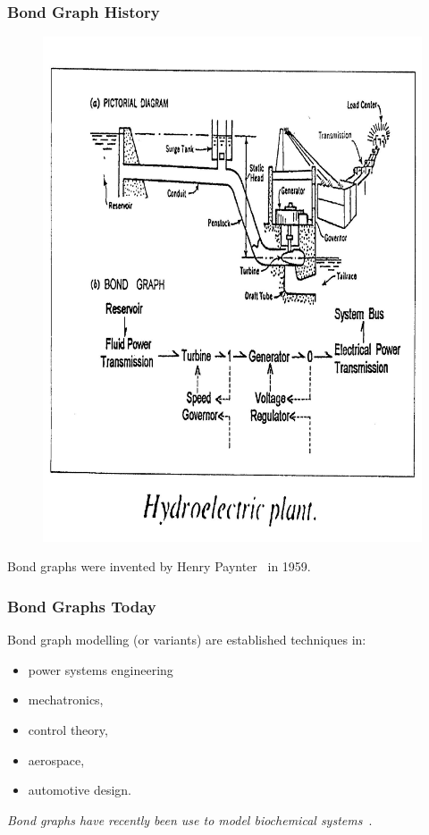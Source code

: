 \begin{frame}
\frametitle{Bond Graph History}
\begin{figure}
\includegraphics[height=0.6\textheight, width=0.7\linewidth]{hydro.jpg}
\end{figure}
Bond graphs were invented by Henry Paynter~\cite{payter2000} in 1959.
\end{frame}
\begin{frame}
\frametitle{Bond Graphs Today}
Bond graph modelling (or variants) are established techniques in:
\begin{itemize}
	\item power systems engineering 
	\item mechatronics,
	\item control theory,
	\item aerospace,
	\item automotive design.
\end{itemize}
\vspace{10pt}
\emph{Bond graphs have recently been use to model biochemical systems}~\cite{Gaw2017a, Gaw2017b, Gaw2014}.
\end{frame}

